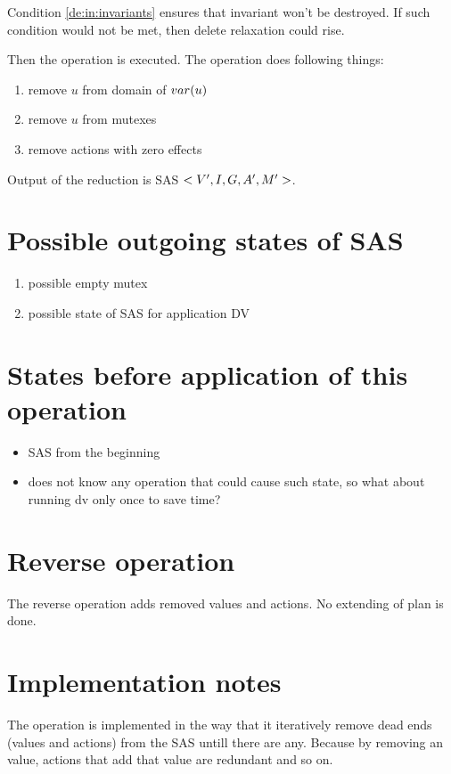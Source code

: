 	Condition \ref{de:in:invariants} ensures that invariant won't be destroyed. If such condition would not be met, then delete relaxation could rise.

	Then the operation is executed. The operation does following things:
	
	\begin{enumerate}
		\item remove $u$ from domain of $var(u)$
		\item remove $u$ from mutexes
		\item remove actions with zero effects
	\end{enumerate}
	
	Output of the reduction is SAS $<V{}', I{}, G{}, A{}', M{}'>$.
	
	
	\section{Possible outgoing states of SAS}
	\begin{enumerate}
		\item possible empty mutex
		\item possible state of SAS for application DV
	\end{enumerate}

	\section{States before application of this operation}
	\begin{itemize}
		\item SAS from the beginning
		\item does not know any operation that could cause such state, so what about running dv only once to save time?
	\end{itemize}

	
	\section{Reverse operation}
	The reverse operation adds removed values and actions. No extending of plan is done.
	
	\section{Implementation notes}
	The operation is implemented in the way that it iteratively remove dead ends (values and actions) from the SAS untill there are any. Because by removing an value, actions that add that value are redundant and so on.
	
	
	
	